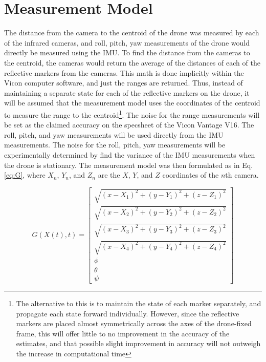 \documentclass[letterpaper, paper,11pt]{AAS}	%
\begin{document}
\section{Measurement Model}

The distance from the camera to the centroid of the drone was measured by each of the infrared cameras, and roll, pitch, yaw measurements of the drone would directly be measured using the IMU. To find the distance from the cameras to the centroid, the cameras would return the average of the distances of each of the reflective markers from the cameras. This math is done implicitly within the Vicon computer software, and just the ranges are returned. Thus, instead of maintaining a separate state for each of the reflective markers on the drone, it will be assumed that the measurement model uses the coordinates of the centroid to measure the range to the centroid\footnote{The alternative to this is to maintain the state of each marker separately, and propagate each state forward individually. However, since the reflective markers are placed almost symmetrically across the axes of the drone-fixed frame, this will offer little to no improvement in the accuracy of the estimates, and that possible slight improvement in accuracy will not outweigh the increase in computational time}. The noise for the range measurements will be set as the claimed accuracy on the specsheet of the Vicon Vantage V16. The roll, pitch, and yaw measurements will be used directly from the IMU measurements. The noise for the roll, pitch, yaw measurements will be experimentally determined by find the variance of the IMU measurements when the drone is stationary. The measurement model was then formulated as in Eq. \ref{eq:G}, where $X_n$, $Y_n$, and $Z_n$ are the $X$, $Y$, and $Z$ coordinates of the $n$th camera.

\begin{equation}
\label{eq:G}
G(X(t), t) = 
\begin{bmatrix}
	\sqrt{(x-X_1)^2 + (y-Y_1)^2 + (z-Z_1)^2} \\
	\sqrt{(x-X_2)^2 + (y-Y_2)^2 + (z-Z_2)^2} \\
	\sqrt{(x-X_3)^2 + (y-Y_3)^2 + (z-Z_3)^2} \\
	\sqrt{(x-X_4)^2 + (y-Y_4)^2 + (z-Z_4)^2} \\
	\phi \\
	\theta \\
	\psi
\end{bmatrix}
\end{equation}
\end{document}
